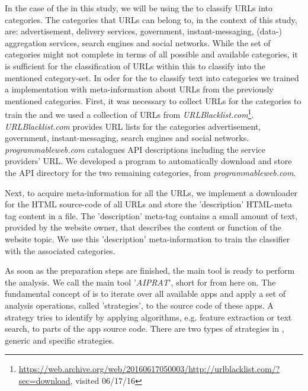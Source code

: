 In the case of the \sca in this study, we will be using the \nbc to classify URLs into categories.
The categories that URLs can belong to, in the context of this study, are: advertisement, delivery services, government, instant-messaging, (data-) aggregation services, search engines and social networks.
While the set of categories might not complete in terms of all possible and available categories, it is sufficient for the classification of URLs within this \sca to classify into the mentioned category-set.
In oder for the \nbc to classify text into categories we trained a \nbc implementation with meta-information about URLs from the previously mentioned categories.
First, it was necessary to collect URLs for the categories to train the \nbc and we used a collection of \acs{URL}s from \textit{URLBlacklist.com}\footnote{\url{https://web.archive.org/web/20160617050003/http://urlblacklist.com/?sec=download}, visited 06/17/16}.
\textit{URLBlacklist.com} provides URL lists for the categories advertisement, government, instant-messaging, search engines and social networks.
\textit{programmableweb.com} catalogues API descriptions including the service providers' URL.
We developed a program to automatically download and store the API directory for the two remaining categories, from \textit{programmableweb.com}.

Next, to acquire meta-information for all the URLs, we implement a downloader for the HTML source-code of all URLs and store the 'description' HTML-meta tag content in a file.
The 'description' meta-tag contains a small amount of text, provided by the website owner, that describes the content or function of the website topic.
We use this 'description' meta-information to train the classifier with the associated categories.\newline

As soon as the preparation steps are finished, the main \sca tool is ready to perform the \ipr analysis.
We call the main \sca tool '\textit{AIPRAT}', short for \aiprat from here on.
The fundamental concept of \AIPRAT is to iterate over all available apps and apply a set of analysis operations, called 'strategies', to the source code of these apps.
A strategy tries to identify \iprfs by applying algorithms, e.g. feature extraction or text search, to parts of the app source code.
There are two types of strategies in \AIPRAT, generic and specific strategies.

